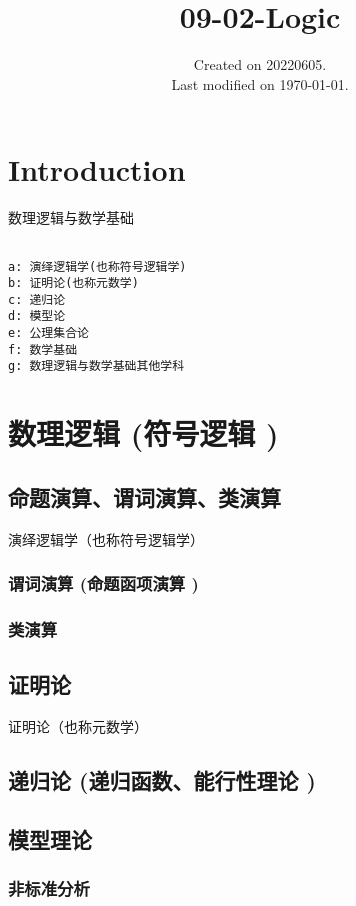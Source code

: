\documentclass[UTF8]{../09-Mathematics}
\begin{document}
\title{09-02-Logic}
\date{Created on 20220605.\\   Last modified on \today.}
\maketitle
\tableofcontents


\chapter{Introduction}

数理逻辑与数学基础


\begin{lstlisting}

a: 演绎逻辑学(也称符号逻辑学)
b: 证明论(也称元数学)
c: 递归论
d: 模型论
e: 公理集合论
f: 数学基础
g: 数理逻辑与数学基础其他学科

\end{lstlisting}






\chapter{数理逻辑 (符号逻辑 )}

\section{命题演算、谓词演算、类演算}
演绎逻辑学（也称符号逻辑学）
    \subsection{谓词演算 (命题函项演算 )}
    \subsection{类演算}


\section{证明论}
证明论（也称元数学）
\section{递归论 (递归函数、能行性理论 )}
\section{模型理论}
    \subsection{非标准分析}
\end{document}
